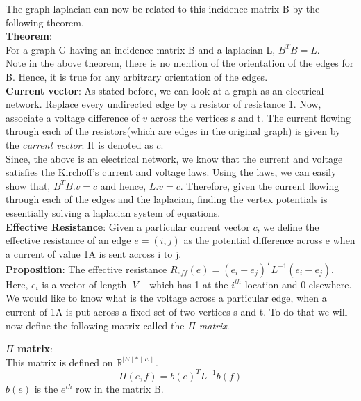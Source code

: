 \documentclass[BTech]{iitmdiss}
\begin{document}
		     The graph laplacian can now be related to this incidence matrix B by the following theorem. \\
		     
		     \textbf{Theorem}: \\
		     For a graph G having an incidence matrix B and a laplacian L,  $B^TB = L$. \\
		     
		     Note in the above theorem, there is no mention of the orientation of the edges for B. Hence, it is true for any arbitrary
		     orientation of the edges. \\
		     
		     \textbf{Current vector}: As stated before, we can look at a graph as an electrical network. Replace every undirected edge by 
		     a resistor of resistance 1. Now, associate a voltage difference of $v$ across the vertices s and t. The current flowing through
 		     each of the resistors(which are edges in the original graph) is given by the \textit{current vector}. It is denoted as $c$. \\
 		     
 		     Since, the above is an electrical network, we know that the current and voltage satisfies the Kirchoff's current and voltage laws.
 		     Using the laws, we can easily show that, $B^TB.v = c$ and hence, $L.v = c$. Therefore, given the current flowing through each of 
 		     the edges and the laplacian, finding the vertex potentials is essentially solving a laplacian system of equations. \\
 		     
 		     \textbf{Effective Resistance}: Given a particular current vector $c$, we define the effective resistance of an edge $e=(i,j)$ as the 
 		     potential difference across e when a current of value 1A is sent across i to j. \\
 		     
 		     \textbf{Proposition}: The effective resistance $R_{eff}(e) = (e_i - e_j)^T L^{-1} (e_i - e_j)$. Here, $e_i$ is a vector of length
 		     $\mid V \mid$ which has 1 at the $i^{th}$ location and 0 elsewhere. \\
 		     
 		     We would like to know what is the voltage across a particular edge, when a current of 1A is put across a fixed set of two vertices
 		     s and t. To do that we will now define the following matrix called the \textit{$\Pi$ matrix}.
 		     
 		     \textbf{$\Pi$ matrix}: \\
 		     This matrix is defined on $\mathbb{R}^{\mid E \mid \ast \mid E \mid}$. 
 		     $$\Pi(e,f) = b(e)^T L^{-1} b(f)$$
 		     $b(e)$ is the $e^{th}$ row in the matrix B. \\
 		     
\end{document}
